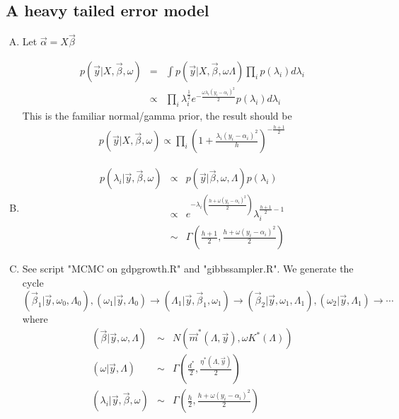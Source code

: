 \documentclass{article}
\begin{document}
\subsection{A heavy tailed error model}
\begin{enumerate}[(A)]
\item

Let $\vec{\alpha}=X\vec{\beta}$

\begin{eqnarray}
p(\vec{y}|X,\vec{\beta},\omega)&=&\int p(\vec{y}|X,\vec{\beta},\omega\Lambda)\prod_ip(\lambda_i)d\lambda_i\nonumber\\
&\propto&\prod_i\lambda_i^{\frac{1}{2}}e^{-\frac{\omega\lambda_i(y_i-\alpha_i)^2}{2}}p(\lambda_i)d\lambda_i
\end{eqnarray}
This is the familiar normal/gamma prior, the result should be
\begin{eqnarray}
p(\vec{y}|X,\vec{\beta},\omega)\propto\prod_i(1+\frac{\lambda_i(y_i-\alpha_i)^2}{h})^{-\frac{h+1}{2}}
\end{eqnarray}

\item
\begin{eqnarray}
p(\lambda_i|\vec{y},\vec{\beta},\omega)&\propto&p(\vec{y}|\vec{\beta},\omega,\Lambda)p(\lambda_i)\nonumber\\
&\propto&e^{-\lambda_i(\frac{h+\omega(y_i-\alpha_i)^2}{2})}\lambda_i^{\frac{h+1}{2}-1}\nonumber\\
&\sim&\Gamma(\frac{h+1}{2},\frac{h+\omega(y_i-\alpha_i)^2}{2})
\end{eqnarray}


\item
See script "MCMC on gdpgrowth.R" and "gibbssampler.R". We generate the cycle
\begin{equation}
(\vec{\beta}_1|\vec{y},\omega_0,\Lambda_0),(\omega_1|\vec{y},\Lambda_0)\rightarrow (\Lambda_1|\vec{y},\vec{\beta}_1,\omega_1)\rightarrow (\vec{\beta}_2|\vec{y},\omega_1,\Lambda_1),(\omega_2|\vec{y},\Lambda_1)\rightarrow\cdots
\end{equation}
where
\begin{eqnarray}
(\vec{\beta}|\vec{y},\omega,\Lambda)&\sim&N(\vec{m}^*(\Lambda,\vec{y}),\omega K^*(\Lambda))\nonumber\\
(\omega|\vec{y},\Lambda)&\sim&\Gamma(\frac{d^*}{2},\frac{\eta^*(\Lambda,\vec{y})}{2})\nonumber\\
(\lambda_i|\vec{y},\vec{\beta},\omega)&\sim&\Gamma(\frac{h}{2},\frac{h+\omega(y_i-\alpha_i)^2}{2})
\end{eqnarray}
\end{enumerate}
\end{document}
